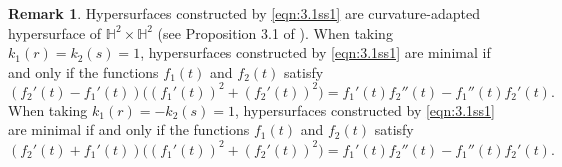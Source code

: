 \documentclass[reqno]{amsart}%
\theoremstyle{definition}
\newtheorem{example}[theorem]{Example}
\newtheorem{remark}{Remark}[section]
\numberwithin{equation}{section}
\begin{document}
%


\begin{remark}\label{rem:3.5fg1}
Hypersurfaces constructed by \eqref{eqn:3.1ss1} are curvature-adapted
hypersurface of $\mathbb{H}^2\times \mathbb{H}^2$ (see Proposition 3.1 of \cite{HLYZ}).
When taking $k_1(r)=k_2(s)=1$,
hypersurfaces constructed by \eqref{eqn:3.1ss1} are minimal if and only if the functions $f_1(t)$ and
$f_2(t)$ satisfy
$$
(f_2'(t)-f_1'(t))\big((f_1'(t))^2+(f_2'(t))^2\big)=f_1'(t)f_2''(t)-f_1''(t)f_2'(t).
$$
When taking $k_1(r)=-k_2(s)=1$,
hypersurfaces constructed by \eqref{eqn:3.1ss1} are minimal if and only if the functions $f_1(t)$ and
$f_2(t)$ satisfy
$$
(f_2'(t)+f_1'(t))\big((f_1'(t))^2+(f_2'(t))^2\big)=f_1'(t)f_2''(t)-f_1''(t)f_2'(t).
$$


\end{remark}
\end{document}
